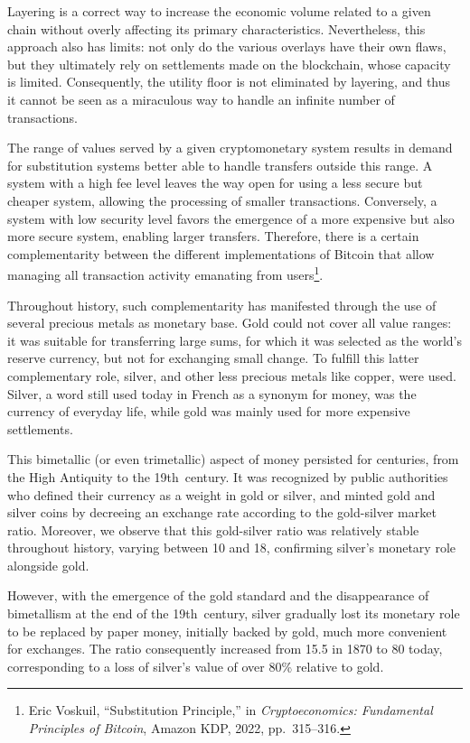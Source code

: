 \documentclass[
  a5paper,
  smalldemyvopaper,10pt,twoside,onecolumn,openright,extrafontsizes,hidelinks]{memoir}
\begin{document}

Layering is a correct way to increase the economic volume related to a
given chain without overly affecting its primary characteristics.
Nevertheless, this approach also has limits: not only do the various
overlays have their own flaws, but they ultimately rely on settlements
made on the blockchain, whose capacity is limited. Consequently, the
utility floor is not eliminated by layering, and thus it cannot be seen
as a miraculous way to handle an infinite number of transactions.

The range of values served by a given cryptomonetary system results in
demand for substitution systems better able to handle transfers outside
this range. A system with a high fee level leaves the way open for using
a less secure but cheaper system, allowing the processing of smaller
transactions. Conversely, a system with low security level favors the
emergence of a more expensive but also more secure system, enabling
larger transfers. Therefore, there is a certain complementarity between
the different implementations of Bitcoin that allow managing all
transaction activity emanating from users\footnote{Eric Voskuil,
  ``Substitution Principle,'' in \emph{Cryptoeconomics: Fundamental
  Principles of Bitcoin}, Amazon KDP, 2022, pp.~315--316.}.

Throughout history, such complementarity has manifested through the use
of several precious metals as monetary base. Gold could not cover all
value ranges: it was suitable for transferring large sums, for which it
was selected as the world's reserve currency, but not for exchanging
small change. To fulfill this latter complementary role, silver, and
other less precious metals like copper, were used. Silver, a word still
used today in French as a synonym for money, was the currency of
everyday life, while gold was mainly used for more expensive
settlements.

This bimetallic (or even trimetallic) aspect of money persisted for
centuries, from the High Antiquity to the 19th~century. It was
recognized by public authorities who defined their currency as a weight
in gold or silver, and minted gold and silver coins by decreeing an
exchange rate according to the gold-silver market ratio. Moreover, we
observe that this gold-silver ratio was relatively stable throughout
history, varying between 10 and 18, confirming silver's monetary role
alongside gold.

However, with the emergence of the gold standard and the disappearance
of bimetallism at the end of the 19th~century, silver gradually lost its
monetary role to be replaced by paper money, initially backed by gold,
much more convenient for exchanges. The ratio consequently increased
from 15.5 in 1870 to 80 today, corresponding to a loss of silver's value
of over 80\% relative to gold.
\end{document}
